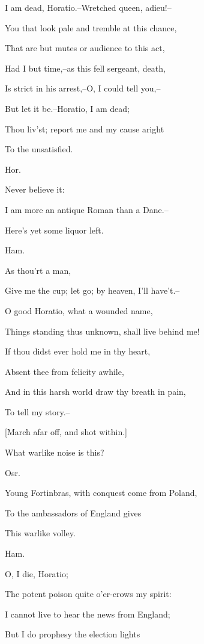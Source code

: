 \documentclass[12pt]{book}
\begin{document}
I am dead, Horatio.--Wretched queen, adieu!--

You that look pale and tremble at this chance,

That are but mutes or audience to this act,

Had I but time,--as this fell sergeant, death,

Is strict in his arrest,--O, I could tell you,--

But let it be.--Horatio, I am dead;

Thou liv'st; report me and my cause aright

To the unsatisfied.



Hor.

Never believe it:

I am more an antique Roman than a Dane.--

Here's yet some liquor left.



Ham.

As thou'rt a man,

Give me the cup; let go; by heaven, I'll have't.--

O good Horatio, what a wounded name,

Things standing thus unknown, shall live behind me!

If thou didst ever hold me in thy heart,

Absent thee from felicity awhile,

And in this harsh world draw thy breath in pain,

To tell my story.--



[March afar off, and shot within.]



What warlike noise is this?



Osr.

Young Fortinbras, with conquest come from Poland,

To the ambassadors of England gives

This warlike volley.



Ham.

O, I die, Horatio;

The potent poison quite o'er-crows my spirit:

I cannot live to hear the news from England;

But I do prophesy the election lights
\end{document}
